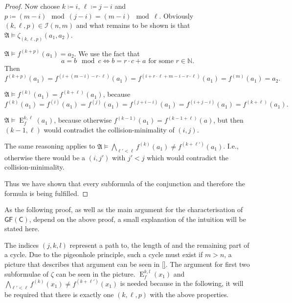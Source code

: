 \documentclass[a4paper,11pt,DIV=15]{scrartcl} %
\theoremstyle{plain}
\theoremstyle{definition}
\newcommand{\GFC}{\mathsf{GF}(\mathsf{C})}
\begin{document}
\begin{proof}
	Now choose $k\coloneqq i$, $\ell \coloneqq j-i$ and $p\coloneqq (m-i) \mod (j-i)= (m-i) \mod \ell$.
	Obviously $(k,\ell,p)\in\mathcal I(n,m)$ and what remains to be shown is that $\mathfrak A\models \zeta_{(k,\ell,p)}(a_1,a_2)$.
	
	$\mathfrak A\models f^{(k+p)}(a_1)=a_2$. We use the fact that
	$$a= b \mod c \Leftrightarrow b = r\cdot c +a \text{ for some } r\in \mathbb N.$$
	Then
	$$f^{(k+p)}(a_1)=f^{(i+(m-i)-r\cdot \ell)}(a_1)=f^{(i+r\cdot \ell + m -i - r\cdot \ell)}(a_1)=f^{(m)}(a_1)=a_2.$$
	
	$\mathfrak A\models f^{(k)}(a_1)=f^{(k+\ell)}(a_1)$, because
	$$f^{(k)}(a_1)=f^{(i)}(a_1)=f^{(j)}(a_1)=f^{(j+i-i)}(a_1)=f^{(i+j-i)}(a_1)=f^{(k+\ell)}(a_1).$$
	
	$\mathfrak A\models \operatorname{E}^{k,\ell}_f(a_1)$, because otherwise $f^{(k-1)}(a_1)=f^{(k-1+\ell)}(a)$, but then $(k-1,\ell)$ would contradict the collision-minimality of $(i,j)$.
	
	The same reasoning applies to $\mathfrak A\models \bigwedge_{\ell'<\ell}f^{(k)}(a_1)\neq f^{(k+\ell')}(a_1)$. I.e., otherwise there would be a $(i,j')$ with $j'<j$ which would contradict the collision-minimality.
	
	Thus we have shown that every subformula of the conjunction and therefore the formula is being fulfilled.
\end{proof}

As the following proof, as well as the main argument for the characterisation of $\GFC$, depend on the above proof, a small explanation of the intuition will be stated here.

The indices $(j,k,l)$ represent a path to, the length of and the remaining part of a cycle.
Due to the pigeonhole principle, such a cycle must exist if $m>n$, a picture that describes that argument can be seen in \ref{}.
The argument for first two subformulae of $\zeta$ can be seen in the picture.
$\operatorname{E}^{k,l}_f(x_1)$ and $\bigwedge_{\ell'<\ell}f^{(k)}(x_1)\neq f^{(k+\ell')}(x_1)$ is needed because in the following, it will be required that there is exactly one $(k,\ell,p)$ with the above properties.
\end{document}

